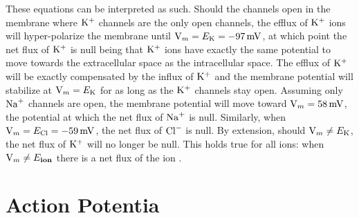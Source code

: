 \documentclass[../../Orator]{subfiles}
\begin{document}
These equations can be interpreted as such. 
Should the channels open in the membrane where \(\mathrm{K}^+\) channels are the only open channels, the efflux of \(\mathrm{K}^+\) ions will hyper-polarize the membrane until \(\Vm = E_\rmm{K} = \qty{-97}{\mV}\), at which point the net flux of \(\mathrm{K}^+\) is null being that \(\mathrm{K}^+\) ions have exactly the same potential to move towards the extracellular space as the intracellular space. 
The efflux of \(\mathrm{K}^+\) will be exactly compensated by the influx of \(\mathrm{K}^+\) and the membrane potential will stabilize at \(\mathrm{V}_m = E_{\mathrm{K}} \) for as long as the \(\mathrm{K}^+\) channels stay open. 
Assuming only \(\mathrm{Na}^+\) channels are open, the membrane potential will move toward \(\Vm = \qty{58}{\mV}\), the potential at which the net flux of \(\mathrm{Na}^+\) is null. 
Similarly, when \(\Vm = E_\rmm{Cl} = \qty{-59}{\mV}\),  
the net flux of \(\mathrm{Cl}^-\) is null. 
By extension, should \(\mathrm{V}_m \neq E_{\mathrm{K}}\), the net flux of  \(\mathrm{K}^+\) will no longer be null. 
This holds true for all ions: when \(\mathrm{V}_m \neq E_{\mathbf{ion}}\) there is a net flux of the ion \cite{}. 

\section{Action Potentia}
\end{document}
